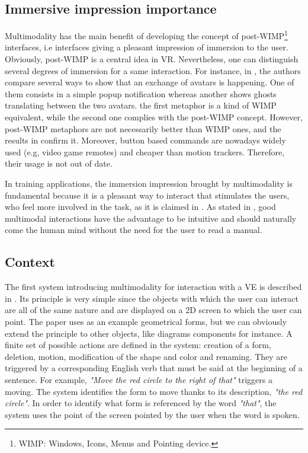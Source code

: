 \documentclass[a4paper]{article}
\begin{document}
\subsection{Immersive impression importance}
Multimodality has the main benefit of developing the concept of post-WIMP\footnote{WIMP: Windows, Icons, Menus and Pointing device.} interfaces, i.e interfaces giving a pleasant impression of immersion to the user. Obviously, post-WIMP is a central idea in VR. Nevertheless, one can distinguish several degrees of immersion for a same interaction. For instance, in \cite{avatars}, the authors compare several ways to show that an exchange of avatars is happening. One of them consists in a simple popup notification whereas another shows ghosts translating between the two avatars. the first metaphor is a kind of WIMP equivalent, while the second one complies with the post-WIMP concept. However, post-WIMP metaphors are not necessarily better than WIMP ones, and the results in \cite{avatars} confirm it. Moreover, button based commands are nowadays widely used (e.g, video game remotes) and cheaper than motion trackers. Therefore, their usage is not out of date.

In training applications, the immersion impression brought by multimodality is fundamental because it is a pleasant way to interact that stimulates the users, who feel more involved in the task, as it is claimed in \cite{eutap}. As stated in \cite{lucente}, good multimodal interactions have the advantage to be intuitive and should naturally come the human mind without the need for the user to read a manual.

\subsection{Context}
The first system introducing multimodality for interaction with a VE is described in \cite{putthatthere}. Its principle is very simple since the objects with which the user can interact are all of the same nature and are displayed on a 2D screen to which the user can point. The paper uses as an example geometrical forms, but we can obviously extend the principle to other objects, like diagrams components for instance. A finite set of possible actions are defined in the system: creation of a form, deletion, motion, modification of the shape and color and renaming. They are triggered by a corresponding English verb that must be said at the beginning of a sentence. For example, \textit{"Move the red circle to the right of that"} triggers a moving. The system identifies the form to move thanks to its description, \textit{"the red circle"}. In order to identify what form is referenced by the word \textit{"that"}, the system uses the point of the screen pointed by the user when the word is spoken.
\end{document}

